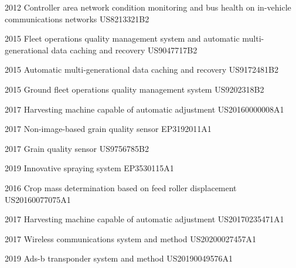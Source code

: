 

\begin{cvpatents}

  \cvpatent
    {2012} %
    {Controller area network condition monitoring and bus health on in-vehicle communications networks} %
    {US8213321B2} %

  \cvpatent
    {2015} %
    {Fleet operations quality management system and automatic multi-generational data caching and recovery} %
    {US9047717B2} %

  \cvpatent
    {2015} %
    {Automatic multi-generational data caching and recovery} %
    {US9172481B2} %

  \cvpatent
    {2015} %
    {Ground fleet operations quality management system} %
    {US9202318B2} %

  \cvpatent
    {2017} %
    {Harvesting machine capable of automatic adjustment} %
    {US20160000008A1} %

  \cvpatent
    {2017} %
    {Non-image-based grain quality sensor} %
    {EP3192011A1} %

  \cvpatent
    {2017} %
    {Grain quality sensor} %
    {US9756785B2} %

  \cvpatent
    {2019} %
    {Innovative spraying system} %
    {EP3530115A1} %

  \cvpatent
    {2016} %
    {Crop mass determination based on feed roller displacement} %
    {US20160077075A1} %

  \cvpatent
    {2017} %
    {Harvesting machine capable of automatic adjustment} %
    {US20170235471A1} %

  \cvpatent
    {2017} %
    {Wireless communications system and method} %
    {US20200027457A1} %

  \cvpatent
    {2019} %
    {Ads-b transponder system and method} %
    {US20190049576A1} %


\end{cvpatents}

